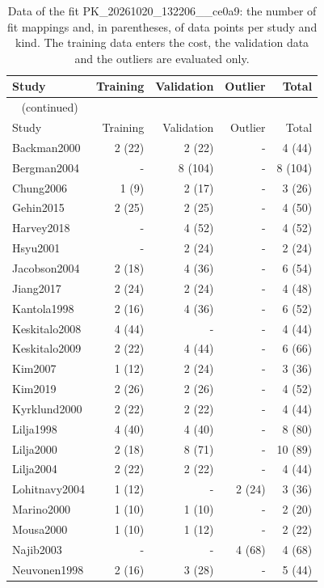 \documentclass{article}
\begin{document}
\begin{longtable}{lrrrr}
\caption{Data of the fit PK\_20261020\_132206\_\_ce0a9: the number of fit mappings and, in parentheses, of data points per study and kind. The training data enters the cost, the validation data and the outliers are evaluated only.}\label{tab:data:PK_20261020_132206__ce0a9} \\
\toprule
Study & Training & Validation & Outlier & Total \\
\midrule
\endfirsthead
\multicolumn{5}{l}{\small\tablename~\thetable{} (continued)} \\
\toprule
Study & Training & Validation & Outlier & Total \\
\midrule
\endhead
\bottomrule
\endlastfoot
Backman2000 & 2 (22) & 2 (22) & - & 4 (44) \\
Bergman2004 & - & 8 (104) & - & 8 (104) \\
Chung2006 & 1 (9) & 2 (17) & - & 3 (26) \\
Gehin2015 & 2 (25) & 2 (25) & - & 4 (50) \\
Harvey2018 & - & 4 (52) & - & 4 (52) \\
Hsyu2001 & - & 2 (24) & - & 2 (24) \\
Jacobson2004 & 2 (18) & 4 (36) & - & 6 (54) \\
Jiang2017 & 2 (24) & 2 (24) & - & 4 (48) \\
Kantola1998 & 2 (16) & 4 (36) & - & 6 (52) \\
Keskitalo2008 & 4 (44) & - & - & 4 (44) \\
Keskitalo2009 & 2 (22) & 4 (44) & - & 6 (66) \\
Kim2007 & 1 (12) & 2 (24) & - & 3 (36) \\
Kim2019 & 2 (26) & 2 (26) & - & 4 (52) \\
Kyrklund2000 & 2 (22) & 2 (22) & - & 4 (44) \\
Lilja1998 & 4 (40) & 4 (40) & - & 8 (80) \\
Lilja2000 & 2 (18) & 8 (71) & - & 10 (89) \\
Lilja2004 & 2 (22) & 2 (22) & - & 4 (44) \\
Lohitnavy2004 & 1 (12) & - & 2 (24) & 3 (36) \\
Marino2000 & 1 (10) & 1 (10) & - & 2 (20) \\
Mousa2000 & 1 (10) & 1 (12) & - & 2 (22) \\
Najib2003 & - & - & 4 (68) & 4 (68) \\
Neuvonen1998 & 2 (16) & 3 (28) & - & 5 (44) \\

\end{longtable}
\end{document}
